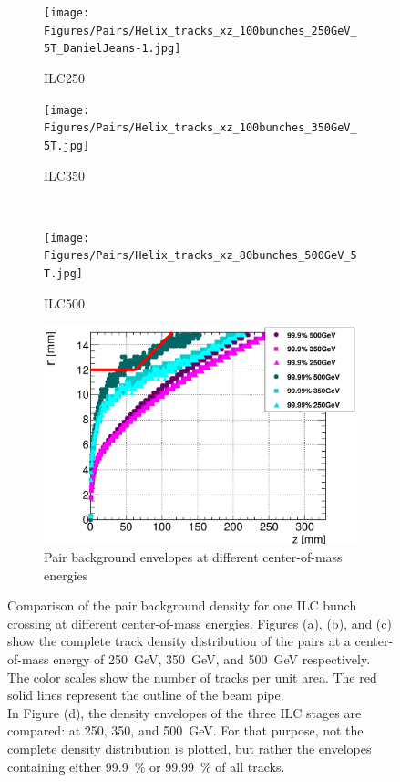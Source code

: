  \begin{figure}
 \centering
  \begin{subfigure}[t]{0.49\textwidth}
   \centering
    \texttt{[image: Figures/Pairs/Helix\_tracks\_xz\_100bunches\_250GeV\_5T\_DanielJeans-1.jpg]}
   \caption{ILC250}
   \end{subfigure}
   \hfill
    \begin{subfigure}[t]{0.49\textwidth}
   \centering
    \texttt{[image: Figures/Pairs/Helix\_tracks\_xz\_100bunches\_350GeV\_5T.jpg]}
   \caption{ILC350}
   \end{subfigure}\\
  \begin{subfigure}[t]{0.49\textwidth}
   \centering
    \texttt{[image: Figures/Pairs/Helix\_tracks\_xz\_80bunches\_500GeV\_5T.jpg]}
   \caption{ILC500}
   \end{subfigure}
   \hfill
    \begin{subfigure}[t]{0.49\textwidth}
   \centering
    \includegraphics[width=\textwidth]{Figures/Pairs/HelixEnvelopes_COMPARISON_xz_500_350_250_comparison_EDITED_2.png}
   \caption{Pair background envelopes at different center-of-mass energies}
   \end{subfigure}
   \caption[Pair background density comparison]{Comparison of the pair background density for one ILC bunch crossing at different center-of-mass energies.
   Figures (a), (b), and (c) show the complete track density distribution of the pairs at a center-of-mass energy of \SI[detect-all]{250}{\GeV}, \SI[detect-all]{350}{\GeV}, and \SI[detect-all]{500}{\GeV} respectively.
   The color scales show the number of tracks per unit area.
   The red solid lines represent the outline of the beam pipe.
   \\In Figure (d), the density envelopes of the three ILC stages are compared: at 250, 350, and \SI[detect-all]{500}{\GeV}.
   For that purpose, not the complete density distribution is plotted, but rather the envelopes containing either \SI[detect-all]{99.9}{\percent} or \SI[detect-all]{99.99}{\percent} of all tracks.
   }
   \label{fig:PairBkg:Density_Comp}
 \end{figure}
